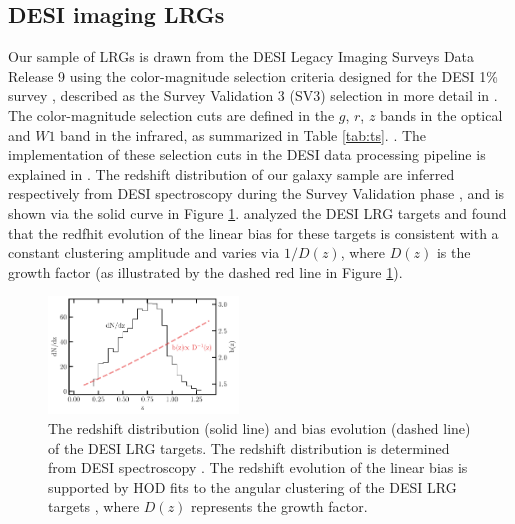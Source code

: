 \subsection{DESI imaging LRGs}
Our sample of LRGs is drawn from the DESI Legacy Imaging Surveys Data Release 9 \citep[DR9;][]{dey2018overview} using the color-magnitude selection criteria designed for the DESI 1\% survey \citep{desi2023sv}, described as the Survey Validation 3 (SV3) selection in more detail in \cite{zhou2022target}. The color-magnitude selection cuts are defined in the $g$, $r$, $z$ bands in the optical and $W1$ band in the infrared, as summarized in Table \ref{tab:ts}. . The implementation of these selection cuts in the DESI data processing pipeline is explained in \cite{myers2022}. The redshift distribution of our galaxy sample are inferred respectively from DESI spectroscopy during the Survey Validation phase \citep{desi2023sv}, and is shown via the solid curve in Figure \ref{fig:nz}. \cite{zhou2021clustering} analyzed the DESI LRG targets and found that the redfhit evolution of the linear bias for these targets is consistent with a constant clustering amplitude and varies via $1/D(z)$, where $D(z)$ is the growth factor (as illustrated by the dashed red line in Figure \ref{fig:nz}). 

\begin{figure}
 \centering
 \includegraphics[width=0.45\textwidth]{figures/nz_lrg.pdf}
 \caption{The redshift distribution (solid line) and bias evolution (dashed line) of the DESI LRG targets. The redshift distribution is determined from DESI spectroscopy \citep{desi2023sv}. The redshift evolution of the linear bias is supported by HOD fits to the angular clustering of the DESI LRG targets \citep{zhou2021clustering}, where $D(z)$ represents the growth factor.}
 \label{fig:nz}
\end{figure}

